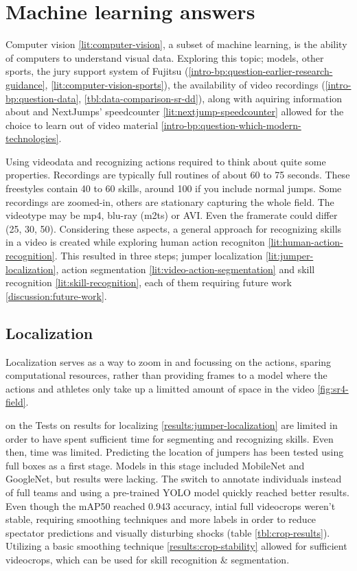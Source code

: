 \section{Machine learning answers}
\label{ch:machine-learning-answers}

Computer vision \ref{lit:computer-vision}, a subset of machine learning, is the ability of computers to understand visual data.
Exploring this topic; models, other sports, the jury support system of Fujitsu (\ref{intro-bp:question-earlier-research-guidance}, \ref{lit:computer-vision-sports}), the availability of video recordings (\ref{intro-bp:question-data}, \ref{tbl:data-comparison-sr-dd}), along with aquiring information about and NextJumps' speedcounter \ref{lit:nextjump-speedcounter} allowed for the choice to learn out of video material \ref{intro-bp:question-which-modern-technologies}.

Using videodata and recognizing actions required to think about quite some properties. Recordings are typically full routines of about 60 to 75 seconds. These freestyles contain 40 to 60 skills, around 100 if you include normal jumps. Some recordings are zoomed-in, others are stationary capturing the whole field. The videotype may be mp4, blu-ray (m2ts) or AVI. Even the framerate could differ (25, 30, 50).
Considering these aspects, a general approach for recognizing skills in a video is created while exploring human action recogniton \ref{lit:human-action-recognition}. This resulted in three steps; jumper localization \ref{lit:jumper-localization}, action segmentation \ref{lit:video-action-segmentation} and skill recognition \ref{lit:skill-recognition}, each of them requiring future work \ref{discussion:future-work}.


\subsection{Localization}

Localization serves as a way to zoom in and focussing on the actions, sparing computational resources, rather than providing frames to a model where the actions and athletes only take up a limitted amount of space in the video \ref{fig:sr4-field}.

on the  Tests on results for localizing \ref{results:jumper-localization} are limited in order to have spent sufficient time for segmenting and recognizing skills. Even then, time was limited. Predicting the location of jumpers has been tested using full boxes as a first stage. Models in this stage included MobileNet and GoogleNet, but results were lacking. The switch to annotate individuals instead of full teams and using a pre-trained YOLO model quickly reached better results. 
Even though the mAP50 reached 0.943 accuracy, intial full videocrops weren't stable, requiring smoothing techniques and more labels in order to reduce spectator predictions and visually disturbing shocks (table \ref{tbl:crop-results}). Utilizing a basic smoothing technique \ref{results:crop-stability} allowed for sufficient videocrops, which can be used for skill recognition \& segmentation.

